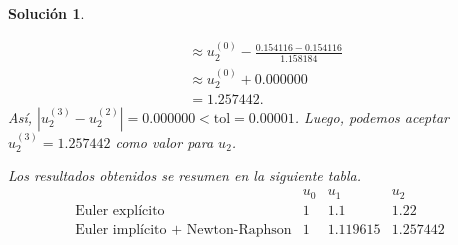 \documentclass[11pt,letterpaper]{article}
\newtheorem*{sol}{Solución}
\newcommand\tol{\mathrm{tol}}
\begin{document}
\begin{sol}
\begin{enumerate}
\begin{align}
        &\approx
          u_{2}^{(0)} - \frac { 0.154116 - 0.154116 } { 1.158184 } \\
        &\approx u_{2}^{(0)} + 0.000000 \\
        &= 1.257442
      .\end{align}
      Así, $|u_2^{(3)}-u_2^{(2)}|=0.000000<\tol=0.00001$. Luego,
      podemos aceptar $u_2^{(3)}=1.257442$ como valor para $u_2$.
  \end{enumerate}
  Los resultados obtenidos se resumen en la siguiente tabla.
  \begin{equation}
    \begin{array}{c|c|c|c}
      & u_0 & u_1 & u_2 \\
      \hline
      \text{Euler explícito}
        & 1 & 1.1 & 1.22 \\
      \hline
      \text{Euler implícito + Newton-Raphson}
        & 1 & 1.119615 & 1.257442
    \end{array}
  \end{equation}
\end{sol}
\end{document}
